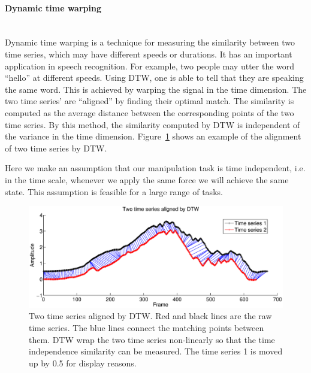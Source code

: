 \paragraph{Dynamic time warping} ~\\
Dynamic time warping is a technique for measuring the similarity between two time series, which may have different speeds or durations. It has an important application in speech recognition. For example, two people may utter the word ``hello'' at different speeds. Using DTW, one is able to tell that they are speaking the same word. This is achieved by warping the signal in the time dimension. The two time series' are ``aligned'' by finding their optimal match. The similarity is computed as the average distance between the corresponding points of the two time series. By this method, the similarity computed by DTW is independent of the variance in the time dimension. Figure~\ref{fig:alignDTW} shows an example of the alignment of two time series by DTW.

Here we make an assumption that our manipulation task is time independent, i.e. in the time scale, whenever we apply the same force we will achieve the same state. This assumption is feasible for a large range of tasks.

\begin{figure}
  \centering
  \includegraphics[width=16cm]{./fig_cha4/alignDTW.eps}
  \caption{ \scriptsize{Two time series aligned by DTW. Red and black lines are the raw time series. The blue lines connect the matching points between them. DTW wrap the two time series non-linearly so that the time independence similarity can be measured. The time series 1 is moved up by 0.5 for display reasons.}
}
\label{fig:alignDTW}
\end{figure}



